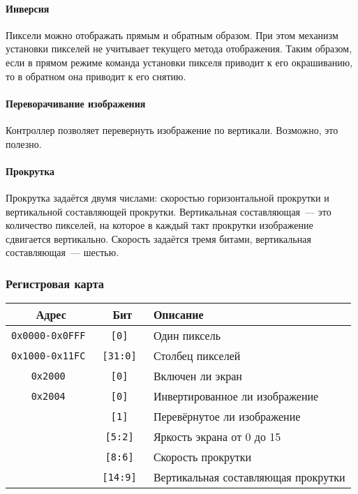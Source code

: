 \documentclass[12pt, a4paper] {ncc}
\begin{document}
\paragraph{Инверсия} Пиксели можно отображать прямым и обратным образом. При
этом механизм установки пикселей не учитывает текущего метода отображения.
Таким образом, если в прямом режиме команда установки пикселя приводит к его
окрашиванию, то в обратном она приводит к его снятию.

\paragraph{Переворачивание изображения} Контроллер позволяет перевернуть
изображение по вертикали. Возможно, это полезно.

\paragraph{Прокрутка} Прокрутка задаётся двумя числами: скоростью
горизонтальной прокрутки и вертикальной составляющей прокрутки. Вертикальная
составляющая~--- это количество пикселей, на которое в каждый такт прокрутки
изображение сдвигается вертикально. Скорость задаётся тремя битами,
вертикальная составляющая~--- шестью.

\subsubsection{Регистровая карта}

\begin{tabular}{|c|c|l|}
        \hline
        \bf Адрес & \bf Бит & \bf Описание \\
        \hline
        \tt 0x0000-0x0FFF & \tt [0] & Один пиксель \\
        \hline
        \tt 0x1000-0x11FC & \tt [31:0] & Столбец пикселей \\
        \hline
        \tt 0x2000 & \tt [0] & Включен ли экран \\
        \hline
        \tt 0x2004 & \tt [0] & Инвертированное ли изображение \\
                   & \tt [1] & Перевёрнутое ли изображение \\
                   & \tt [5:2] & Яркость экрана от 0 до 15 \\
                   & \tt [8:6] & Скорость прокрутки \\
                   & \tt [14:9] & Вертикальная составляющая прокрутки \\
        \hline
\end{tabular}
\end{document}
